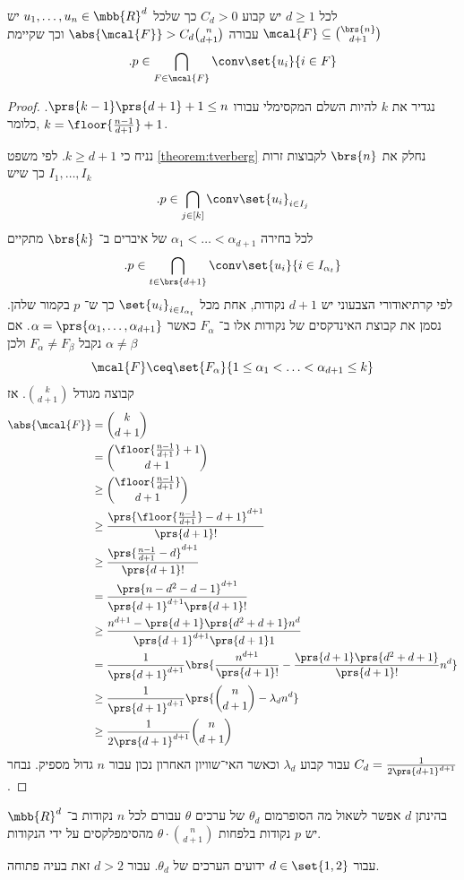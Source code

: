 \documentclass[a4paper,10pt,twoside,openany]{book}
\begin{document}
\begin{theorem}
לכל
$d \geq 1$
יש קבוע
$C_d > 0$
כך שלכל
$u_1, \ldots, u_n \in \mbb{R}^d$
יש
$\mcal{F} \subseteq \binom{\brs{n}}{d+1}$
עבורה
$\abs{\mcal{F}} > C_d \binom{n}{d+1}$
וכך שקיימת
\[\text{.} p \in \bigcap_{F \in \mcal{F}} \conv\set{u_i}{i \in F}\]
\end{theorem}

\begin{proof}
נגדיר את
$k$
להיות השלם המקסימלי עבורו
$\prs{k-1}\prs{d+1} + 1 \leq n$.
כלומר,
$k = \floor{\frac{n-1}{d+1}} + 1$.

נניח כי
$k \geq d+1$.
לפי משפט
\ref{theorem:tverberg}
נחלק את
$\brs{n}$
לקבוצות זרות
$I_1, \ldots, I_k$
כך שיש
\[\text{.} p \in \bigcap_{j \in [k]} \conv\set{u_i}_{i \in I_j}\]
לכל בחירה
$\alpha_1 < \ldots < \alpha_{d+1}$
של איברים ב־%
$\brs{k}$
מתקיים
\[\text{.} p \in \bigcap_{t \in \brs{d+1}} \conv\set{u_i}{i \in I_{\alpha_t}}\]
לפי קרתיאודורי הצבעוני יש
$d+1$
נקודות, אחת מכל
$\set{u_i}_{i \in I_{\alpha_t}}$
כך ש־%
$p$
בקמור שלהן.
נסמן את קבוצת האינדקסים של נקודות אלו ב־%
$F_{\alpha}$
כאשר
$\alpha = \prs{\alpha_1, \ldots, \alpha_{d+1}}$.
אם
$\alpha \neq \beta$
נקבל
$F_\alpha \neq F_\beta$
ולכן
\[\mcal{F} \ceq \set{F_{\alpha}}{1 \leq \alpha_1 < \ldots < \alpha_{d+1} \leq k}\]
קבוצה מגודל
$\binom{k}{d+1}$.
אז
\begin{align*}
\abs{\mcal{F}}
&=
\binom{k}{d+1}
\\&=
\binom{\floor{\frac{n-1}{d+1}} + 1}{d+1}
\\&\geq
\binom{\floor{\frac{n-1}{d+1}}}{d+1}
\\&\geq
\frac{\prs{\floor{\frac{n-1}{d+1}} - d + 1}^{d+1}}{\prs{d+1}!}
\\&\geq \frac{\prs{\frac{n-1}{d+1} - d}^{d+1}}{\prs{d+1}!}
\\&= \frac{\prs{n-d^2 - d - 1}^{d+1}}{\prs{d+1}^{d+1} \prs{d+1}!}
\\&\geq \frac{n^{d+1} - \prs{d+1}\prs{d^2 + d + 1} n^d}{\prs{d+1}^{d+1} \prs{d+1}1}
\\&= \frac{1}{\prs{d+1}^{d+1}} \brs{\frac{n^{d+1}}{\prs{d+1}!} - \frac{\prs{d+1}\prs{d^2 + d + 1}}{\prs{d+1}!} n^d}
\\&\geq \frac{1}{\prs{d+1}^{d+1}} \prs{\binom{n}{d+1} - \lambda_d n^d}
\\&\geq \frac{1}{2 \prs{d+1}^{d+1}} \binom{n}{d+1}
\end{align*}
עבור קבוע
$\lambda_d$
וכאשר האי־שוויון האחרון נכון עבור
$n$
גדול מספיק.
נבחר
$C_d = \frac{1}{2 \prs{d+1}^{d+1}}$.
\end{proof}

\begin{remark}
בהינתן
$d$
אפשר לשאול מה הסופרמום
$\theta_d$
של ערכים
$\theta$
עבורם לכל
$n$
נקודות ב־%
$\mbb{R}^d$
יש
$p$
נקודות בלפחות
$\theta \cdot \binom{n}{d+1}$
מהסימפלקסים על ידי הנקודות.

עבור
$d \in \set{1,2}$
ידועים הערכים של
$\theta_d$.
עבור
$d > 2$
זאת בעיה פתוחה.
\end{remark}

\backmatter
\end{document}
